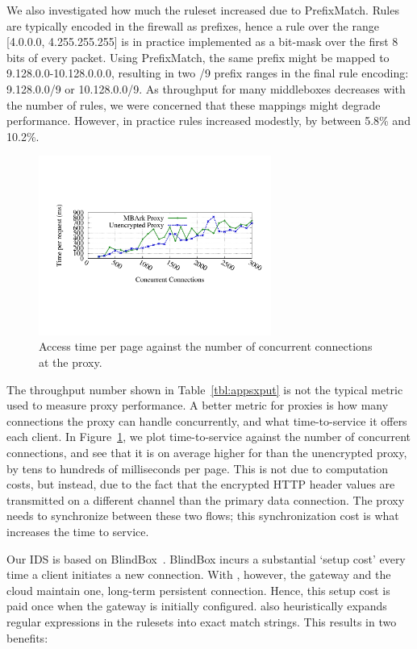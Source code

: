 We also investigated how much the ruleset increased due to PrefixMatch. Rules are typically encoded in the firewall as prefixes, hence a rule over the range [4.0.0.0, 4.255.255.255] is in practice implemented as a bit-mask over the first 8 bits of every packet.
Using PrefixMatch, the same prefix might be mapped to 9.128.0.0-10.128.0.0.0, resulting in two /9 prefix ranges in the final rule encoding: 9.128.0.0/9 or 10.128.0.0/9.
As throughput for many middleboxes decreases with the number of rules, we were concerned that these mappings might degrade performance. However, in practice rules increased modestly, by between 5.8\% and 10.2\%.

\begin{figure}[t]
\centering
\vspace{-10pt}
\includegraphics[width=3in]{fig/proxytime}
\caption{\label{fig:proxygraph} Access time per page against the number of concurrent connections at the proxy.}
\end{figure}

 The throughput number shown in Table~\ref{tbl:appsxput} is not the typical metric used to measure proxy performance. A better metric for proxies is how many connections the proxy can handle concurrently, and what time-to-service it offers each client. In Figure~\ref{fig:proxygraph}, we plot time-to-service against the number of concurrent connections, and see that it is on average higher for \sys than the unencrypted proxy, by tens to hundreds of milliseconds per page.
This is not due to computation costs, but instead, due to the fact that the encrypted HTTP header values are transmitted on a different channel than the primary data connection.
The \sys proxy needs to synchronize between these two flows; this synchronization cost is what increases the time to service. 


Our IDS is based on BlindBox~\cite{blindbox}. BlindBox incurs a substantial `setup cost' every time a client initiates a new connection. With \sys, however, the gateway and the cloud maintain one, long-term persistent connection. 
Hence, this setup cost is paid once when the gateway is initially configured. \sys also heuristically expands regular expressions in the rulesets into exact match strings. This results in two benefits:


